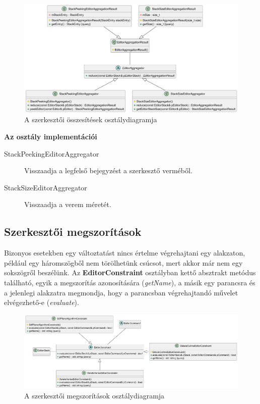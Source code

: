 \begin{figure}[H]
    \centering
    \includegraphics[width=1\linewidth]{images/class_editor_aggregator.png}
    \caption{A szerkesztői összesítések osztálydiagramja}
    \label{fig:class_editor_aggregator-1}
\end{figure}

\textbf{Az osztály implementációi}

\begin{description}
    \item[StackPeekingEditorAggregator] Visszaadja a legfelső bejegyzést a szerkesztő verméből.
    \item[StackSizeEditorAggregator] Visszaadja a verem méretét.
\end{description}

\subsection{Szerkesztői megszorítások}

Bizonyos esetekben egy változtatást nincs értelme végrehajtani egy alakzaton, például egy háromszögből nem törölhetünk csúcsot, mert akkor már nem egy sokszögről beszélünk. Az \textbf{EditorConstraint} osztályban kettő absztrakt metódus található, egyik a megszorítás azonosítására (\textit{getName}), a másik egy parancsra és a jelenlegi alakzatra megmondja, hogy a parancsban végrehajtandó művelet elvégezhető-e (\textit{evaluate}).

\begin{figure}[H]
    \centering
    \includegraphics[width=1\linewidth]{images/class_editor_constraint.png}
    \caption{A szerkesztői megszorítások osztálydiagramja}
    \label{fig:class_editor_constraint-1}
\end{figure}

